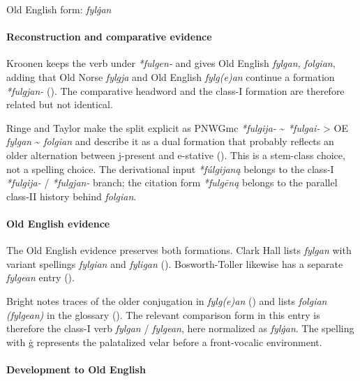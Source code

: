 \documentclass[
  british,
  a4paper,
]{article}
\begin{document}
Old English form: \emph{fylġan}

\paragraph{Reconstruction and comparative
evidence}\label{reconstruction-and-comparative-evidence-11}

Kroonen keeps the verb under \emph{*fulgen-} and gives Old English
\emph{fylgan, folgian}, adding that Old Norse \emph{fylgja} and Old
English \emph{fylg(e)an} continue a formation \emph{*fulgjan-}
(). The comparative
headword and the class-I formation are therefore related but not
identical.

Ringe and Taylor make the split explicit as PNWGmc \emph{*fulgija-}
\textasciitilde{} \emph{*fulgai-} \textgreater{} OE \emph{fylgan}
\textasciitilde{} \emph{folgian} and describe it as a dual formation
that probably reflects an older alternation between j-present and
e-stative (). This is a stem-class choice, not a spelling choice. The
derivational input \emph{*fúlgijaną} belongs to the class-I
\emph{*fulgija-} / \emph{*fulgjan-} branch; the citation form
\emph{*fulgēną} belongs to the parallel class-II history behind
\emph{folgian}.

\paragraph{Old English evidence}\label{old-english-evidence-11}

The Old English evidence preserves both formations. Clark Hall lists
\emph{fylgan} with variant spellings \emph{fylgian} and \emph{fyligan}
(). Bosworth-Toller
likewise has a separate \emph{fylgean} entry
().

Bright notes traces of the older conjugation in \emph{fylg(e)an}
() and lists
\emph{folgian (fylgean)} in the glossary
(). The
relevant comparison form in this entry is therefore the class-I verb
\emph{fylgan} / \emph{fylgean}, here normalized as \emph{fylġan}. The
spelling with ġ represents the palatalized velar before a front-vocalic
environment.

\paragraph{Development to Old
English}\label{development-to-old-english-11}
\end{document}

